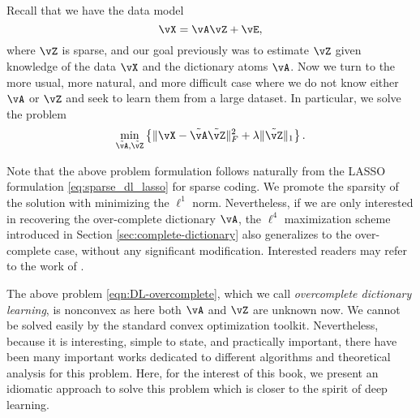 \documentclass[../../book-main.tex]{subfiles}
\begin{document}
Recall that we have the data model 
\begin{equation}
    \vX = \vA\vZ + \vE,
\end{equation}
where \(\vZ\) is sparse, and our goal previously was to estimate \(\vZ\) given knowledge of the data \(\vX\) and the dictionary atoms \(\vA\). Now we turn to the more usual, more natural, and more difficult case where we do not know either \(\vA\) or \(\vZ\) and seek to learn them from a large dataset. In particular, we solve the problem
\begin{equation}
    \min_{\tilde{\vA}, \tilde{\vZ}}\bc{\norm{\vX - \tilde{\vA}\tilde{\vZ}}_{F}^{2} + \lambda \norm{\tilde{\vZ}}_{1}}.
    \label{eqn:DL-overcomplete}
\end{equation}
\begin{remark}
Note that the above problem formulation follows naturally from the LASSO formulation \eqref{eq:sparse_dl_lasso} for sparse coding. We promote the sparsity of the solution with minimizing the \(\ell^1\) norm. Nevertheless, if we are only interested in recovering the over-complete dictionary \(\vA\), the \(\ell^4\) maximization scheme introduced in Section \ref{sec:complete-dictionary} also generalizes to the over-complete case, without any significant modification. Interested readers may refer to the work of \cite{Qu2020Geometric}. 
\end{remark}

The above problem \eqref{eqn:DL-overcomplete}, which we call \textit{overcomplete dictionary learning}, is nonconvex as here both \(\vA\) and \(\vZ\) are unknown now. We cannot be solved easily by the standard convex optimization toolkit. Nevertheless, because it is interesting, simple to state, and practically important, there have been many important works dedicated to different algorithms and theoretical analysis for this problem. Here, for the interest of this book, we present an idiomatic approach to solve this problem which is closer to the spirit of deep learning.
\end{document}
